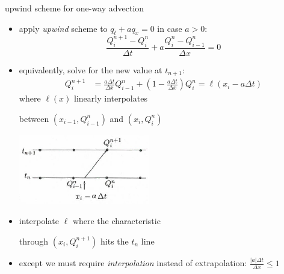 \documentclass[10pt,hyperref]{beamer}
\newcommand{\ds}{\displaystyle}
\begin{document}
\begin{frame}{upwind scheme for one-way advection}

\begin{itemize}
\item apply \emph{upwind} scheme to $q_t + aq_x=0$ in case $a>0$:
    $$\frac{Q_i^{n+1} - Q_i^n}{\Delta t} + a \frac{Q_i^n - Q_{i-1}^n}{\Delta x} = 0$$
\item equivalently, solve for the new value at $t_{n+1}$:
\begin{align*}
Q_i^{n+1} &= \frac{a\Delta t}{\Delta x} Q_{i-1}^n + \left(1 - \frac{a\Delta t}{\Delta x}\right) Q_i^n = \ell(x_i-a\Delta t)
\end{align*}
where $\ell(x)$ linearly interpolates

\noindent between $(x_{i-1},Q_{i-1}^n)$ and $(x_i,Q_i^n)$

\vspace{-9mm}
\hfill \includegraphics[width=0.45\textwidth]{figs/leveque4p4a}

\vspace{-7mm}
\item interpolate $\ell$ where the characteristic

\noindent through $(x_i,Q_i^{n+1})$ hits the $t_n$ line

\item except we must require \emph{interpolation} instead of extrapolation: $\ds \frac{|a|\Delta t}{\Delta x} \le 1$
\end{itemize}
\end{frame}
\end{document}
